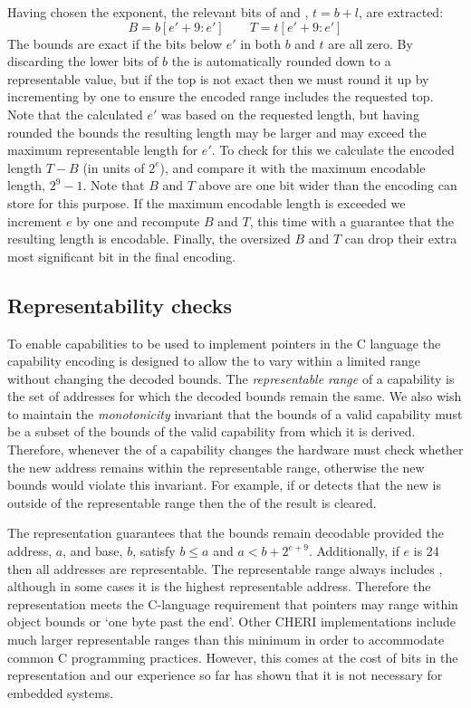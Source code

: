 Having chosen the exponent, the relevant bits of \cbase{} and \ctop{}, $t = b + l$, are extracted:
\[
  B = b[e' + 9: e'] \hspace{2em} T = t[e' + 9: e']
\]
The bounds are exact if the bits below $e'$ in both $b$ and $t$ are all zero.
By discarding the lower bits of $b$ the \cbase{} is automatically rounded down to a representable value,
but if the top is not exact then we must round it up by incrementing by one to ensure the encoded range includes the requested top.
Note that the calculated $e'$ was based on the requested length, but having rounded the bounds the resulting length may be larger and may exceed the maximum representable length for $e'$.
To check for this we calculate the encoded length $T - B$ (in units of $2^e$), and compare it with the maximum encodable length, $2^9 - 1$.
Note that $B$ and $T$ above are one bit wider than the encoding can store for this purpose.
If the maximum encodable length is exceeded we increment $e$ by one and recompute $B$ and $T$, this time with a guarantee that the resulting length is encodable.
Finally, the oversized $B$ and $T$ can drop their extra most significant bit in the final encoding.
\subsection{Representability checks}
\label{sec:repcheck}

To enable capabilities to be used to implement pointers in the C language the capability encoding is designed to allow the \caddress{} to vary within a limited range without changing the decoded bounds.
The \emph{representable range} of a capability is the set of addresses for which the decoded bounds remain the same.
We also wish to maintain the \emph{monotonicity} invariant that the bounds of a valid capability must be a subset of the bounds of the valid capability from which it is derived.
Therefore, whenever the \caddress{} of a capability changes the hardware must check whether the new address remains within the representable range, otherwise the new bounds would violate this invariant.
For example, if  or  detects that the new \caddress{} is outside of the representable range then the \ctag{} of the result is cleared.

The representation guarantees that the bounds remain decodable provided the address, $a$, and base, $b$, satisfy $b \le a$ and $a \lt b + 2^{e+9}$.
Additionally, if $e$ is 24 then all addresses are representable.
The representable range always includes \ctop{}, although in some cases it is the highest representable address.
Therefore the representation meets the C-language requirement that pointers may range within object bounds or `one byte past the end'.
Other CHERI implementations include much larger representable ranges than this minimum in order to accommodate common C programming practices.
However, this comes at the cost of bits in the representation and our experience so far has shown that it is not necessary for embedded systems.

